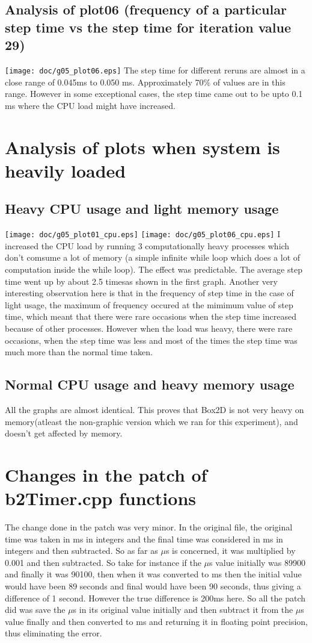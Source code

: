 \documentclass[11pt,english]{article}
\begin{document}
\subsection{
Analysis of plot06 (frequency of a particular step time vs the step time for iteration value 29) }
\texttt{[image: doc/g05\_plot06.eps]}
The step time for different reruns are almost in a close range of 0.045ms to 0.050 ms. Approximately 70\% of values are in this range. However in some exceptional cases, the step time came out to be upto 0.1 ms where the CPU load might have increased.


\section{
	Analysis of plots when system is heavily loaded}
\subsection{
	Heavy CPU usage and light memory usage}
\texttt{[image: doc/g05\_plot01\_cpu.eps]}
\texttt{[image: doc/g05\_plot06\_cpu.eps]}
I increased the CPU load by running 3 computationally heavy processes which don't comsume a lot of memory (a simple infinite while loop which does a lot of computation inside the while loop). The effect was predictable. The average step time went up by about 2.5 timesas shown in the first graph. Another very interesting observation here is that in the frequency of step time in the case of light usage, the maximum of frequency occured at the mimimum value of step time, which meant that there were rare occasions when the step time increased because of other processes. However when the load was heavy, there were rare occasions, when the step time was less and most of the times the step time was much more than the normal time taken. 
\subsection{
	Normal CPU usage and heavy memory usage}
All the graphs are almost identical. This proves that Box2D is not very heavy on memory(atleast the non-graphic version which we ran for this experiment), and doesn't get affected by memory.

\section{
	Changes in the patch of b2Timer.cpp functions}
The change done in the patch was very minor. In the original file, the original time was taken in ms in integers and the final time was considered in ms in integers and then subtracted. So as far as $\mu$s is concerned, it was multiplied by 0.001 and then subtracted. So take for instance if the $\mu$s value initially was 89900 and finally it was 90100, then when it was converted to ms then the initial value would have been 89 seconds and final would have been 90 seconds, thus giving a difference of 1 second. However the true difference is 200ms here. So all the patch did was save the $\mu$s in its original value initially and then subtract it from the $\mu$s value finally and then converted to ms and returning it in floating point precision, thus eliminating the error.
\end{document}
